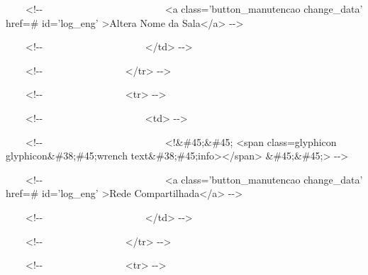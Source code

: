 {\ttfamily\color[rgb]{0.10980392,0.10980392,0.10980392}
    \ \ \ \ {\textless}!-{}- \ \ \ \ \ \ \ \ \ \ \ \ \ \ \ \ \ \ \ \ \ \ \ \ {\textless}a class='button\_manutencao
        change\_data' href={\textquotedbl}\#{\textquotedbl} id='log\_eng' {\textgreater}Altera Nome da
        Sala{\textless}/a{\textgreater} -{}-{\textgreater}}

{\ttfamily\color[rgb]{0.10980392,0.10980392,0.10980392}
    \ \ \ \ {\textless}!-{}- \ \ \ \ \ \ \ \ \ \ \ \ \ \ \ \ \ \ \ \ {\textless}/td{\textgreater} -{}-{\textgreater}}

{\ttfamily\color[rgb]{0.10980392,0.10980392,0.10980392}
    \ \ \ \ {\textless}!-{}- \ \ \ \ \ \ \ \ \ \ \ \ \ \ \ \ {\textless}/tr{\textgreater} -{}-{\textgreater}}

{\ttfamily\color[rgb]{0.10980392,0.10980392,0.10980392}
    \ \ \ \ {\textless}!-{}- \ \ \ \ \ \ \ \ \ \ \ \ \ \ \ \ {\textless}tr{\textgreater} -{}-{\textgreater}}

{\ttfamily\color[rgb]{0.10980392,0.10980392,0.10980392}
    \ \ \ \ {\textless}!-{}- \ \ \ \ \ \ \ \ \ \ \ \ \ \ \ \ \ \ \ \ {\textless}td{\textgreater} -{}-{\textgreater}}

{\ttfamily\color[rgb]{0.10980392,0.10980392,0.10980392}
    \ \ \ \ {\textless}!-{}- \ \ \ \ \ \ \ \ \ \ \ \ \ \ \ \ \ \ \ \ \ \ \ \ {\textless}!\&\#45;\&\#45; {\textless}span
        class={\textquotedbl}glyphicon glyphicon\&\#38;\#45;wrench
        text\&\#38;\#45;info{\textquotedbl}{\textgreater}{\textless}/span{\textgreater} \&\#45;\&\#45;{\textgreater}
    -{}-{\textgreater}}

{\ttfamily\color[rgb]{0.10980392,0.10980392,0.10980392}
    \ \ \ \ {\textless}!-{}- \ \ \ \ \ \ \ \ \ \ \ \ \ \ \ \ \ \ \ \ \ \ \ \ {\textless}a class='button\_manutencao
        change\_data' href={\textquotedbl}\#{\textquotedbl} id='log\_eng' {\textgreater}Rede
        Compartilhada{\textless}/a{\textgreater} -{}-{\textgreater}}

{\ttfamily\color[rgb]{0.10980392,0.10980392,0.10980392}
    \ \ \ \ {\textless}!-{}- \ \ \ \ \ \ \ \ \ \ \ \ \ \ \ \ \ \ \ \ {\textless}/td{\textgreater} -{}-{\textgreater}}

{\ttfamily\color[rgb]{0.10980392,0.10980392,0.10980392}
    \ \ \ \ {\textless}!-{}- \ \ \ \ \ \ \ \ \ \ \ \ \ \ \ \ {\textless}/tr{\textgreater} -{}-{\textgreater}}

{\ttfamily\color[rgb]{0.10980392,0.10980392,0.10980392}
    \ \ \ \ {\textless}!-{}- \ \ \ \ \ \ \ \ \ \ \ \ \ \ \ \ {\textless}tr{\textgreater} -{}-{\textgreater}}

